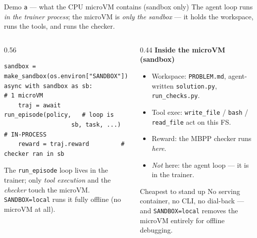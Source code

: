\documentclass[aspectratio=169]{beamer}
\begin{document}
\begin{frame}[fragile]{Demo \texttt{a} --- what the CPU microVM contains (sandbox only)}
  \footnotesize The agent loop runs \emph{in the trainer process}; the microVM is \emph{only the
  sandbox} --- it holds the workspace, runs the tools, and runs the checker.
  \begin{columns}[T]
    \begin{column}{0.56\textwidth}
{\scriptsize
\begin{verbatim}
sandbox = make_sandbox(os.environ["SANDBOX"])
async with sandbox as sb:              # 1 microVM
    traj = await run_episode(policy,   # loop is
                   sb, task, ...)      # IN-PROCESS
    reward = traj.reward         # checker ran in sb
\end{verbatim}}
      \scriptsize The \texttt{run\_episode} loop lives in the trainer; only \emph{tool execution} and the
      \emph{checker} touch the microVM. \texttt{SANDBOX=local} runs it fully offline (no microVM at all).
    \end{column}
    \begin{column}{0.44\textwidth}
      \footnotesize\textbf{Inside the microVM (sandbox)}
      \begin{itemize}\setlength\itemsep{0.08em}
        \item Workspace: \texttt{PROBLEM.md}, agent-written \texttt{solution.py}, \texttt{run\_checks.py}.
        \item Tool exec: \texttt{write\_file} / \texttt{bash} / \texttt{read\_file} act on this FS.
        \item Reward: the MBPP checker runs \emph{here}.
        \item \emph{Not} here: the agent loop --- it is in the trainer.
      \end{itemize}
      \begin{block}{Cheapest to stand up}
        \scriptsize No serving container, no CLI, no dial-back --- and \texttt{SANDBOX=local}
        removes the microVM entirely for offline debugging.
      \end{block}
    \end{column}
  \end{columns}
\end{frame}
\end{document}
